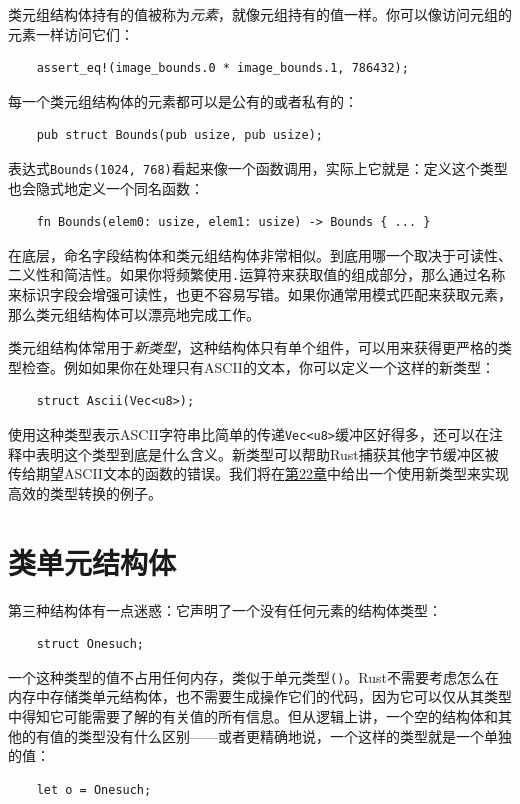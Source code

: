 类元组结构体持有的值被称为\emph{元素}，就像元组持有的值一样。你可以像访问元组的元素一样访问它们：
\begin{verbatim}
    assert_eq!(image_bounds.0 * image_bounds.1, 786432);
\end{verbatim}

每一个类元组结构体的元素都可以是公有的或者私有的：
\begin{verbatim}
    pub struct Bounds(pub usize, pub usize);
\end{verbatim}

表达式\texttt{Bounds(1024, 768)}看起来像一个函数调用，实际上它就是：定义这个类型也会隐式地定义一个同名函数：
\begin{verbatim}
    fn Bounds(elem0: usize, elem1: usize) -> Bounds { ... }
\end{verbatim}

在底层，命名字段结构体和类元组结构体非常相似。到底用哪一个取决于可读性、二义性和简洁性。如果你将频繁使用\texttt{.}运算符来获取值的组成部分，那么通过名称来标识字段会增强可读性，也更不容易写错。如果你通常用模式匹配来获取元素，那么类元组结构体可以漂亮地完成工作。

类元组结构体常用于\emph{新类型}，这种结构体只有单个组件，可以用来获得更严格的类型检查。例如如果你在处理只有ASCII的文本，你可以定义一个这样的新类型：
\begin{verbatim}
    struct Ascii(Vec<u8>);
\end{verbatim}

使用这种类型表示ASCII字符串比简单的传递\texttt{Vec<u8>}缓冲区好得多，还可以在注释中表明这个类型到底是什么含义。新类型可以帮助Rust捕获其他字节缓冲区被传给期望ASCII文本的函数的错误。我们将在\hyperref[ch22]{第22章}中给出一个使用新类型来实现高效的类型转换的例子。

\section{类单元结构体}

第三种结构体有一点迷惑：它声明了一个没有任何元素的结构体类型：
\begin{verbatim}
    struct Onesuch;
\end{verbatim}

一个这种类型的值不占用任何内存，类似于单元类型\texttt{()}。Rust不需要考虑怎么在内存中存储类单元结构体，也不需要生成操作它们的代码，因为它可以仅从其类型中得知它可能需要了解的有关值的所有信息。但从逻辑上讲，一个空的结构体和其他的有值的类型没有什么区别——或者更精确地说，一个这样的类型就是一个单独的值：
\begin{verbatim}
    let o = Onesuch;
\end{verbatim}


